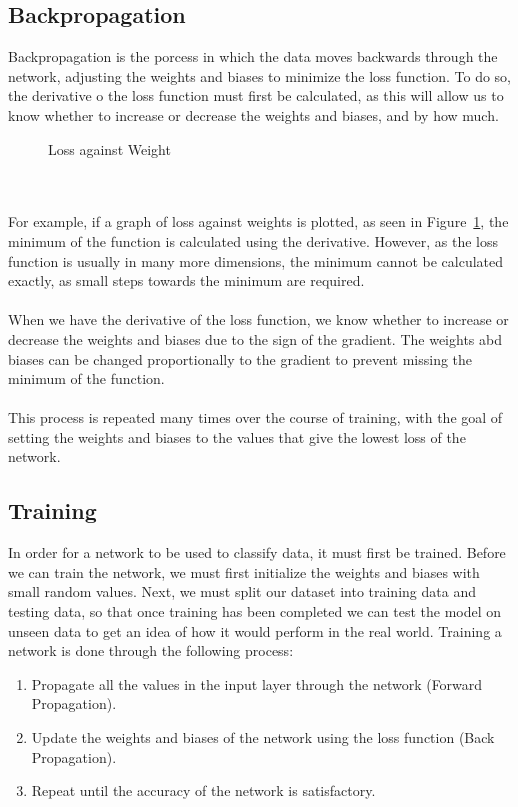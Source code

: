 \documentclass[titlepage]{article}
\begin{document}
\subsection{Backpropagation}
Backpropagation is the porcess in which the data moves backwards through the network, adjusting the weights and biases to minimize the loss function. To do so, the derivative o the loss function must first be calculated, as this will allow us to know whether to increase or decrease the weights and biases, and by how much.
\begin{figure}[h!]
    \begin{center}
    \end{center}
    \caption{Loss against Weight}
    \label{fig:loss-vs-weights}
\end{figure}
\\\\
For example, if a graph of loss against weights is plotted, as seen in Figure~\ref{fig:loss-vs-weights}, the minimum of the function is calculated using the derivative. However, as the loss function is usually in many more dimensions, the minimum cannot be calculated exactly, as small steps towards the minimum are required. 
\\\\
When we have the derivative of the loss function, we know whether to increase or decrease the weights and biases due to the sign of the gradient. The weights abd biases can be changed proportionally to the gradient to prevent missing the minimum of the function.
\\\\
This process is repeated many times over the course of training, with the goal of setting the weights and biases to the values that give the lowest loss of the network.
\subsection{Training}
In order for a network to be used to classify data, it must first be trained. Before we can train the network, we must first initialize the weights and biases with small random values. Next, we must split our dataset into training data and testing data, so that once training has been completed we can test the model on unseen data to get an idea of how it would perform in the real world. Training a network is done through the following process:
\begin{enumerate}
    \item Propagate all the values in the input layer through the network (Forward Propagation).
    \item Update the weights and biases of the network using the loss function (Back Propagation).
    \item Repeat until the accuracy of the network is satisfactory.
\end{enumerate}
\newpage
\end{document}
